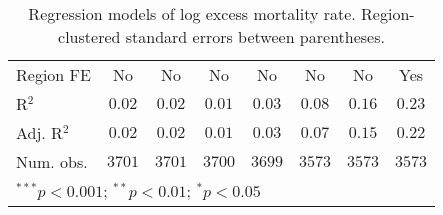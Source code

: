 \begin{table}
\begin{center}
\begin{tabular}{l c c c c c c c}
\hline
Region FE      & No           & No           & No           & No           & No            & No            & Yes           \\
R$^2$          & $0.02$       & $0.02$       & $0.01$       & $0.03$       & $0.08$        & $0.16$        & $0.23$        \\
Adj. R$^2$     & $0.02$       & $0.02$       & $0.01$       & $0.03$       & $0.07$        & $0.15$        & $0.22$        \\
Num. obs.      & $3701$       & $3701$       & $3700$       & $3699$       & $3573$        & $3573$        & $3573$        \\
\hline
\multicolumn{8}{l}{\scriptsize{$^{***}p<0.001$; $^{**}p<0.01$; $^{*}p<0.05$}}
\end{tabular}
\caption{Regression models of log excess mortality rate. Region-clustered standard errors between parentheses.}
\label{tab:basemodels}
\end{center}
\end{table}
